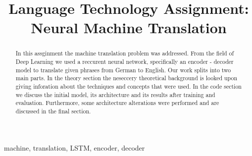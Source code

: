 ﻿\documentclass[conference]{IEEEtran}
\begin{document}
\title{ Language Technology Assignment: Neural Machine Translation\\

}

\author{
\and
{}
}

\maketitle

\begin{abstract}

In this assginment the machine translation problem was addressed. From the field of Deep Learning we used a reccurent neural network, specifically an encoder - decoder model to translate given phrases from German to English. Our work splits into two main parts. In the theory section the neseccery theoretical background is looked upon giving inforation about the techniques and concepts that were used. In the code section we discuss the initial model, its architecture and its results after training and evaluation. Furthermore, some architecture alterations were performed and are discussed in the final section. 

\end{abstract}

\begin{IEEEkeywords}
machine, translation, LSTM, encoder, decoder
\end{IEEEkeywords}
\end{document}
